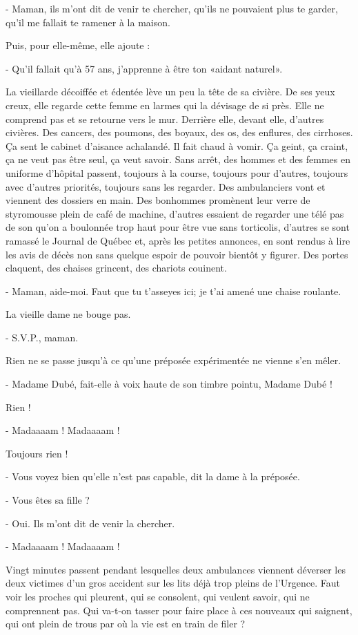 - Maman, ils m’ont dit de venir te chercher, qu’ils ne pouvaient plus te garder, qu’il me fallait te ramener à la maison.

Puis, pour elle-même, elle ajoute :

- Qu’il fallait qu’à 57 ans, j’apprenne à être ton «aidant naturel».

La vieillarde décoiffée et édentée lève un peu la tête de sa civière. De ses yeux creux, elle regarde cette femme en larmes qui la dévisage de si près. Elle ne comprend pas et se retourne vers le mur. Derrière elle, devant elle, d’autres civières. Des cancers, des poumons, des boyaux, des os, des enflures, des cirrhoses. Ça sent le cabinet d’aisance achalandé. Il fait chaud à vomir. Ça geint, ça craint, ça ne veut pas être seul, ça veut savoir. Sans arrêt, des hommes et des femmes en uniforme d’hôpital passent, toujours à la course, toujours pour d’autres, toujours avec d’autres priorités, toujours sans les regarder. Des ambulanciers vont et viennent des dossiers en main. Des bonhommes promènent leur verre de styromousse plein de café de machine, d’autres essaient de regarder une télé pas de son qu’on a boulonnée trop haut pour être vue sans torticolis, d’autres se sont ramassé le Journal de Québec et, après les petites annonces, en sont rendus à lire les avis de décès non sans quelque espoir de pouvoir bientôt y figurer. Des portes claquent, des chaises grincent, des chariots couinent.

- Maman, aide-moi. Faut que tu t’asseyes ici; je t’ai amené une chaise roulante.

La vieille dame ne bouge pas.

- S.V.P., maman.

Rien ne se passe jusqu’à ce qu’une préposée expérimentée ne vienne s’en mêler.

- Madame Dubé, fait-elle à voix haute de son timbre pointu, Madame Dubé !

Rien !

- Madaaaam ! Madaaaam !

Toujours rien !

- Vous voyez bien qu’elle n’est pas capable, dit la dame à la préposée.

- Vous êtes sa fille ?

- Oui. Ils m’ont dit de venir la chercher.

- Madaaaam ! Madaaaam !

Vingt minutes passent pendant lesquelles deux ambulances viennent déverser les deux victimes d’un gros accident sur les lits déjà trop pleins de l’Urgence. Faut voir les proches qui pleurent, qui se consolent, qui veulent savoir, qui ne comprennent pas. Qui va-t-on tasser pour faire place à ces nouveaux qui saignent, qui ont plein de trous par où la vie est en train de filer ?

